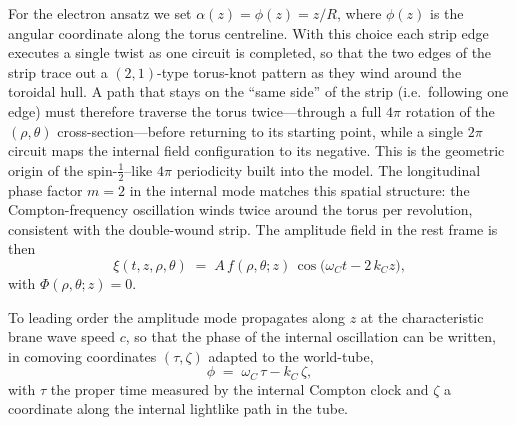 For the electron ansatz we set $\alpha(z) = \phi(z) = z/R$, where
$\phi(z)$ is the angular coordinate along the torus centreline. With this
choice each strip edge executes a single twist as one circuit is
completed, so that the two edges of the strip trace out a
$(2,1)$-type torus-knot pattern as they wind around the toroidal hull.
A path that stays on the ``same side'' of the strip (i.e.\ following one
edge) must therefore traverse the torus twice---through a full $4\pi$
rotation of the $(\rho,\theta)$ cross-section---before returning to its
starting point, while a single $2\pi$ circuit maps the internal field
configuration to its negative. This is the geometric origin of the
spin-$\tfrac12$--like $4\pi$ periodicity built into the model. The
longitudinal phase factor $m=2$ in the internal mode matches this spatial
structure: the Compton-frequency oscillation winds twice around the torus
per revolution, consistent with the double-wound strip. The amplitude
field in the rest frame is then
%
\begin{equation}
  \xi(t,z,\rho,\theta)
  \;=\;
  A\,f(\rho,\theta;z)\,
  \cos\!\bigl(\omega_C t - 2\,k_C z\bigr),
  \label{eq:xi-electron-init}
\end{equation}
%
with $\Phi(\rho,\theta;z)=0$.

To leading order the amplitude mode propagates along $z$ at the
characteristic brane wave speed $c$, so that the phase of the internal
oscillation can be written, in comoving coordinates $(\tau,\zeta)$
adapted to the world-tube,
%
\begin{equation}
  \phi
  \;=\;
  \omega_C\,\tau - k_C\,\zeta,
  \label{eq:xi-internal-phase}
\end{equation}
%
with $\tau$ the proper time measured by the internal Compton clock and
$\zeta$ a coordinate along the internal lightlike path in the tube.

